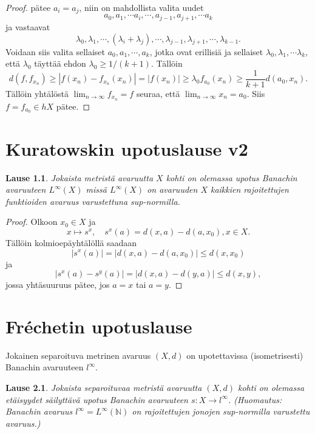 \documentclass[12pt,a4paper,leqno]{report}
\newcommand{\N}{\mathbb{N}}
\theoremstyle{plain}
\newtheorem{lause}[equation]{Lause}
\theoremstyle{definition}
\theoremstyle{remark}
\begin{document}
\begin{proof}
pätee $ a_i=a_j$, niin on mahdollista valita uudet $$a_0,a_1,\cdots a_i,\cdots, a_{j-1},a_{j+1},\cdots a_{k}$$ ja vastaavat $$\lambda_0,\lambda_1,\cdots, (\lambda_i+\lambda_j),\cdots ,
\lambda_{j-1},
\lambda_{j+1},\cdots, \lambda_{k-1}.$$ 
Voidaan siis valita sellaiset $a_0,a_1,\cdots, a_k$, jotka ovat erillisiä ja sellaiset $\lambda_0,\lambda_1,\cdots \lambda_k$, että $\lambda_0$ täyttää ehdon $\lambda_0\geq 1/(k+1)$. Tällöin $$d(f,f_{x_n})\geq |f(x_n)-f_{x_n}(x_n)|=|f(x_n)|\geq \lambda_0 f_{a_0}(x_n)\geq \dfrac{1}{k+1}d(a_0,x_n).$$
Tällöin yhtälöstä $\lim_{n\rightarrow\infty} f_{x_n}=f$ seuraa, että $\lim_{n\rightarrow\infty }x_n=a_0$. Siis $ f=f_{a_0}\in hX$ pätee.

\end{proof}



\chapter{Kuratowskin upotuslause v2}\label{Kuratowski2}

\begin{lause}Jokaista metristä avaruutta $X$ kohti on olemassa upotus Banachin avaruuteen $L^{\infty}(X)$ missä $L^{\infty}(X)$ on avaruuden $X$ kaikkien rajoitettujen funktioiden avaruus varustettuna sup-normilla.
\end{lause}

\begin{proof}
Olkoon $x_0\in X$ ja 
$$ x\mapsto s^x,\quad s^x(a)=d(x,a)-d(a,x_0),x\in X.$$ 
Tällöin kolmioepäyhtälöllä saadaan 
$$|s^x(a)|=|d(x,a)-d(a,x_0)|\leq d(x,x_0)$$
ja 
$$|s^x(a)-s^y(a)|=|d(x,a)-d(y,a)|\leq d(x,y),$$
jossa yhtäsuuruus pätee, jos $a=x $ tai $a=y $.

\end{proof} 







\chapter{Fréchetin upotuslause}\label{Frechet}

Jokainen separoituva metrinen avaruus $(X,d)$ on upotettavissa (isometrisesti) Banachin avaruuteen $l^\infty$. 
\begin{lause}Jokaista separoituvaa metristä avaruutta $(X,d)$ kohti on olemassa etäisyydet säilyttävä upotus Banachin avaruuteen $s\colon X\rightarrow l^\infty$. 
(Huomautus: Banachin avaruus $l^\infty=L^\infty(\N)$ on rajoitettujen jonojen sup-normilla varustettu avaruus.)
\end{lause}
\end{document}
